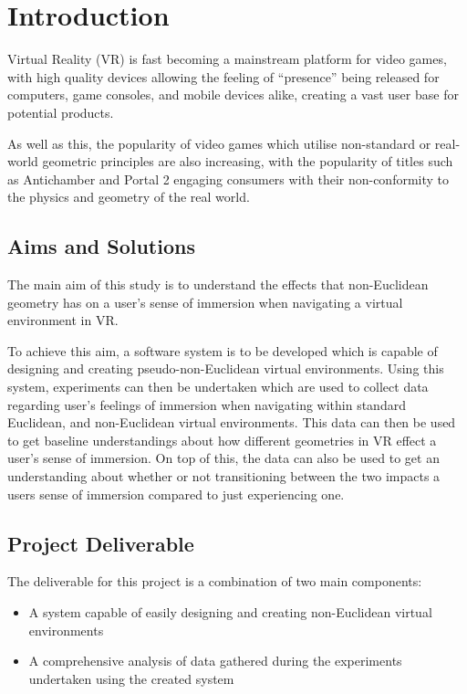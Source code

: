 \chapter{Introduction}
\label{intro}

	Virtual Reality (VR) is fast becoming a mainstream platform for video games, with high quality devices allowing the feeling of \enquote{presence} being released for computers, game consoles, and mobile devices alike, creating a vast user base for potential products.

	As well as this, the popularity of video games which utilise non-standard or real-world geometric principles are also increasing, with the popularity of titles such as Antichamber \cite{Antichamber2013} and Portal 2 \cite{Portal22011} engaging consumers with their non-conformity to the physics and geometry of the real world.

	\section{Aims and Solutions}

		The main aim of this study is to understand the effects that non-Euclidean geometry has on a user's sense of immersion when navigating a virtual environment in VR.

		To achieve this aim, a software system is to be developed which is capable of designing and creating pseudo-non-Euclidean virtual environments.
		Using this system, experiments can then be undertaken which are used to collect data regarding user's feelings of immersion when navigating within standard Euclidean, and non-Euclidean virtual environments.
		This data can then be used to get baseline understandings about how different geometries in VR effect a user's sense of immersion.
		On top of this, the data can also be used to get an understanding about whether or not transitioning between the two impacts a users sense of immersion compared to just experiencing one.

	\section{Project Deliverable}

		The deliverable for this project is a combination of two main components:
		\begin{itemize}
			\item A system capable of easily designing and creating non-Euclidean virtual environments %

			\item A comprehensive analysis of data gathered during the experiments undertaken using the created system %
		\end{itemize}

